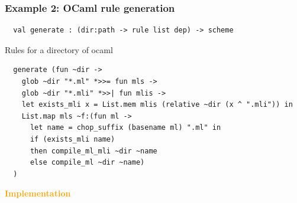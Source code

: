 \documentclass{beamer}
\begin{document}
%
%


\begin{frame}[fragile]
\frametitle{Example 2: OCaml rule generation}
{\footnotesize
\begin{verbatim}
  val generate : (dir:path -> rule list dep) -> scheme
\end{verbatim}}
Rules for a directory of ocaml
{\footnotesize
\begin{verbatim}
  generate (fun ~dir ->
    glob ~dir "*.ml" *>>= fun mls ->
    glob ~dir "*.mli" *>>| fun mlis ->
    let exists_mli x = List.mem mlis (relative ~dir (x ^ ".mli")) in
    List.map mls ~f:(fun ml ->
      let name = chop_suffix (basename ml) ".ml" in
      if (exists_mli name)
      then compile_ml_mli ~dir ~name
      else compile_ml ~dir ~name)
  )

\end{verbatim}}
\end{frame}



\begin{frame}[fragile]
\huge
\begin{center}
{\bf \textcolor{orange}{Implementation}}
\end{center}
\end{frame}

\end{document}
